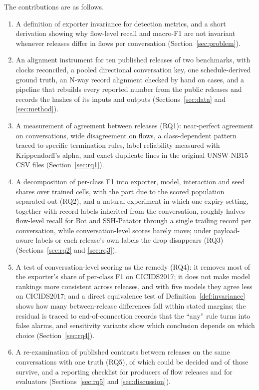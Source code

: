 \documentclass[pdflatex,sn-mathphys-num]{sn-jnl}
\newcommand{\cicids}{CICIDS2017}
\theoremstyle{thmstyleone}%
\theoremstyle{thmstylethree}%
\begin{document}
\noindent The contributions are as follows.
\begin{enumerate}
\item A definition of exporter invariance for detection metrics, and a short derivation showing why flow-level recall and macro-F1 are not invariant whenever releases differ in flows per conversation (Section~\ref{sec:problem}).
\item An alignment instrument for ten published releases of two benchmarks, with clocks reconciled, a pooled directional conversation key, one schedule-derived ground truth, an N-way record alignment checked by hand on \NhandCases{} cases, and a pipeline that rebuilds every reported number from the public releases and records the hashes of its inputs and outputs (Sections~\ref{sec:data} and \ref{sec:method}).
\item A measurement of agreement between releases (RQ1): near-perfect agreement on conversations, wide disagreement on flows, a class-dependent pattern traced to specific termination rules, label reliability measured with Krippendorff's alpha, and \RQoneUnswDups{} exact duplicate lines in the original UNSW-NB15 CSV files (Section~\ref{sec:rq1}).
\item A decomposition of per-class F1 into exporter, model, interaction and seed shares over \RQtwoCells{} trained cells, with the part due to the scored population separated out (RQ2), and a natural experiment in which one expiry setting, together with record labels inherited from the conversation, roughly halves flow-level recall for Bot and SSH-Patator through a single trailing record per conversation, while conversation-level scores barely move; under payload-aware labels or each release's own labels the drop disappears (RQ3) (Sections~\ref{sec:rq2} and \ref{sec:rq3}).
\item A test of conversation-level scoring as the remedy (RQ4): it removes most of the exporter's share of per-class F1 on \cicids{}; it does not make model rankings more consistent across releases, and with five models they agree less on \cicids{}; and a direct equivalence test of Definition~\ref{def:invariance} shows how many between-release differences fall within stated margins; the residual is traced to end-of-connection records that the ``any'' rule turns into false alarms, and \RQfourSensVariants{} sensitivity variants show which conclusion depends on which choice (Section~\ref{sec:rq4}).
\item A re-examination of \RQfiveRows{} published contrasts between releases on the same conversations with one truth (RQ5), of which \RevFiveDecided{} could be decided and \RQfiveSurvive{} of those survive, and a reporting checklist for producers of flow releases and for evaluators (Sections~\ref{sec:rq5} and \ref{sec:discussion}).
\end{enumerate}
\end{document}
